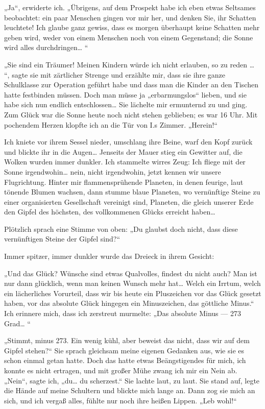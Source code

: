 „Ja“, erwiderte ich. „Übrigens, auf dem Prospekt habe ich eben
etwas Seltsames beobachtet: ein paar Menschen gingen vor mir her,
und denken Sie, ihr Schatten leuchtete! Ich glaube ganz gewiss,
dass es morgen überhaupt keine Schatten mehr geben wird, weder von
einem Menschen noch von einem Gegenstand; die Sonne wird alles
durchdringen\ldots{} “

„Sie sind ein Träumer! Meinen Kindern würde ich nicht erlauben, so
zu reden \ldots{} “, sagte sie mit zärtlicher Strenge und erzählte mir,
dass sie ihre ganze Schulklasse zur Operation geführt habe und dass
man die Kinder an den Tischen hatte festbinden müssen. Doch man
müsse ja „erbarmungslos“ lieben, und sie habe sich nun endlich
entschlossen\ldots{} Sie lächelte mir ermunternd zu und ging. Zum Glück
war die Sonne heute noch nicht stehen geblieben; es war 16 Uhr. Mit
pochendem Herzen klopfte ich an die Tür von I.s Zimmer. „Herein!“

Ich kniete vor ihrem Sessel nieder, umschlang ihre Beine, warf den
Kopf zurück und blickte ihr in die Augen\ldots{} Jenseits der Mauer
stieg ein Gewitter auf, die Wolken wurden immer dunkler. Ich
stammelte wirres Zeug: Ich fliege mit der Sonne irgendwohin\ldots{}
nein, nicht irgendwohin, jetzt kennen wir unsere Flugrichtung.
Hinter mir flammensprühende Planeten, in denen feurige, laut
tönende Blumen wachsen, dann stumme blaue Planeten, wo vernünftige
Steine zu einer organisierten Gesellschaft vereinigt sind,
Planeten, die gleich unserer Erde den Gipfel des höchsten, des
vollkommenen Glücks erreicht haben\ldots{}

Plötzlich sprach eine Stimme von oben: „Du glaubst doch nicht, dass
diese vernünftigen Steine der Gipfel sind?“

Immer spitzer, immer dunkler wurde das Dreieck in ihrem Gesicht:

„Und das Glück? Wünsche sind etwas Qualvolles, findest du nicht
auch? Man ist nur dann glücklich, wenn man keinen Wunsch mehr
hat\ldots{} Welch ein Irrtum, welch ein lächerliches Vorurteil, dass wir
bis heute ein Pluszeichen vor das Glück gesetzt haben, vor das
absolute Glück hingegen ein Minuszeichen, das göttliche Minus.“ Ich
erinnere mich, dass ich zerstreut murmelte: „Das absolute Minus —
273 Grad\ldots{} “

„Stimmt, minus 273. Ein wenig kühl, aber beweist das nicht, dass
wir auf dem Gipfel stehen?“ Sie sprach gleichsam meine eigenen
Gedanken aus, wie sie es schon einmal getan hatte. Doch das hatte
etwas Beängstigendes für mich, ich konnte es nicht ertragen, und
mit großer Mühe zwang ich mir ein Nein ab. „Nein“, sagte ich,
„du\ldots{} du scherzest.“ Sie lachte laut, zu laut. Sie stand auf,
legte die Hände auf meine Schultern und blickte mich lange an. Dann
zog sie mich an sich, und ich vergaß alles, fühlte nur noch ihre
heißen Lippen. „Leb wohl!“

